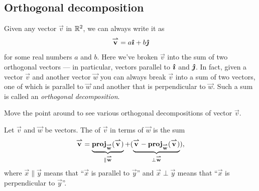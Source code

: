 \documentclass{ximera}
\begin{document}
%
%  
%




\subsection{Orthogonal decomposition}


Given any vector $\vec{v}$ in $\mathbb R^2$, we can always write it as
\[
{\overset{\boldsymbol{\rightharpoonup}}{\mathbf{v}}} = a{\boldsymbol{\hat{\imath}}} + b{\boldsymbol{\hat{\jmath}}}
\]
for some real numbers $a$ and $b$.  Here we've broken $\vec{v}$ into
the sum of two orthogonal vectors --- in particular, vectors parallel to
${\boldsymbol{\hat{\imath}}}$ and ${\boldsymbol{\hat{\jmath}}}$. In fact, given a vector $\vec{v}$ and another
vector $\vec{w}$ you can always break $\vec{v}$ into a sum of two
vectors, one of which is parallel to $\vec{w}$ and another that is
perpendicular to $\vec{w}$. Such a sum is called an \textit{orthogonal
  decomposition}.
\begin{onlineOnly}
  Move the point around to see various orthogonal decompositions of
  vector $\vec{v}$.
  \begin{center}
  \end{center}
\end{onlineOnly}

\begin{definition}
Let $\vec v$ and $\vec w$ be vectors. The  of $\vec v$ in terms of $\vec{w}$ is the sum
\[
{\overset{\boldsymbol{\rightharpoonup}}{\mathbf{v}}} = \underbrace{\operatorname{\mathbf{proj}}_{{\overset{\boldsymbol{\rightharpoonup}}{\mathbf{w}}}}({\overset{\boldsymbol{\rightharpoonup}}{\mathbf{v}}})}_{\parallel {\overset{\boldsymbol{\rightharpoonup}}{\mathbf{w}}}} +  (\underbrace{{\overset{\boldsymbol{\rightharpoonup}}{\mathbf{v}}}-\operatorname{\mathbf{proj}}_{{\overset{\boldsymbol{\rightharpoonup}}{\mathbf{w}}}}({\overset{\boldsymbol{\rightharpoonup}}{\mathbf{v}}})}_{\perp {\overset{\boldsymbol{\rightharpoonup}}{\mathbf{w}}}}),
\]
where $\vec{x} \parallel \vec{y}$ means that ``$\vec{x}$ is parallel
to $\vec{y}$'' and $\vec{x} \perp\vec{y}$ means that ``$\vec{x}$ is
perpendicular to $\vec{y}$''.
\end{definition}
\end{document}
